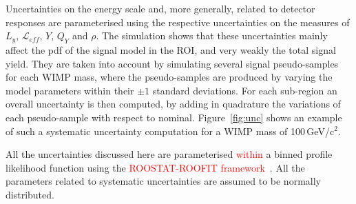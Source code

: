 Uncertainties on the energy scale and, more generally, related to detector responses  are parameterised 
using the respective uncertainties on the measures of $L_y$, $\mathcal{L}_{eff}$, $Y$, $Q_Y$ and $\rho$. The simulation shows 
that these uncertainties mainly affect the pdf of the signal model in the ROI, and very weakly the total signal yield. 
They are taken into account by simulating several signal pseudo-samples for each WIMP mass, where the pseudo-samples are produced 
by varying the model parameters within their $\pm 1$ standard deviations. 
For each sub-region an overall uncertainty is then computed, by adding in quadrature the variations of each pseudo-sample 
with respect to nominal. Figure~\ref{fig:unc} shows an example of such a systematic uncertainty computation for a WIMP mass of 100\,GeV/c$^2$.


All the uncertainties discussed here are parameterised 
 \textcolor{red}{within} 
a binned profile likelihood function using the \textcolor{red}{ROOSTAT-ROOFIT framework}~\cite{roostat,roofit}.
All the parameters related to systematic uncertainties are assumed to be normally distributed.


















